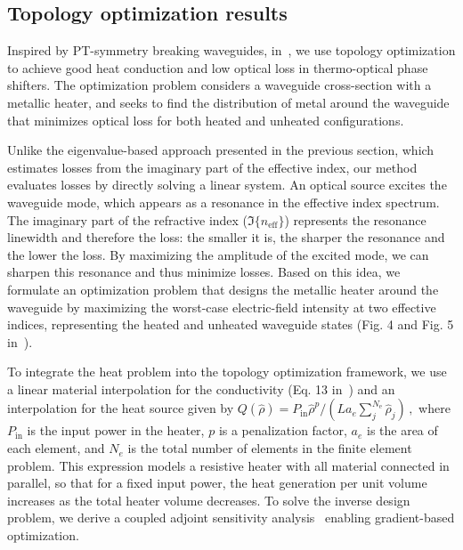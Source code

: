 \subsection*{Topology optimization results~\cite{ownpub0}}

Inspired by PT-symmetry breaking waveguides, in~\cite{ownpub0}, we use topology optimization to achieve good heat conduction and low optical loss in thermo-optical phase shifters.
The optimization problem considers a waveguide cross-section with a metallic heater, and seeks to find the distribution of metal around the waveguide that minimizes optical loss for both heated and 
unheated configurations. 

Unlike the eigenvalue-based approach presented in the previous section, which estimates losses from the imaginary part of the effective index,
 our method evaluates losses by directly solving a linear system. An optical source excites the waveguide mode, which appears
  as a resonance in the effective index spectrum. The imaginary part of the refractive index ($\Im\{n_\text{eff}\}$) represents the resonance linewidth and therefore the loss:
   the smaller it is, the sharper the resonance and the lower the loss. By maximizing the amplitude of the excited mode,
    we can sharpen this resonance and thus minimize losses. Based on this idea, we formulate an optimization problem that designs
     the metallic heater around the waveguide by maximizing the worst-case electric-field intensity at two effective indices, representing
      the heated and unheated waveguide states (Fig. 4 and Fig. 5 in~\cite{ownpub0}).
 
 To integrate the heat problem into the 
 topology optimization framework, we use a linear material interpolation 
for the conductivity (Eq. 13 in~\cite{ownpub0}) and an interpolation for the heat source given by $
 Q(\hat{\rho})=P_{\text{in}} \hat{\rho}^p / \left( L a_e \sum^{N_\text{e}}_j \hat{\rho}_j \right)\,,
$
where $P_\text{in}$ is the input power in the heater, $p$ is a penalization factor, $a_e$ is the area of each element, and 
$N_e$ is the total number of elements in the finite element problem. 
This expression models a resistive heater with all material connected in parallel, so that for a fixed input power, the heat 
generation per unit volume increases as the total heater volume decreases.
To solve the inverse design
problem, we derive a coupled adjoint sensitivity analysis~\cite{ownpub0} enabling gradient-based optimization.

